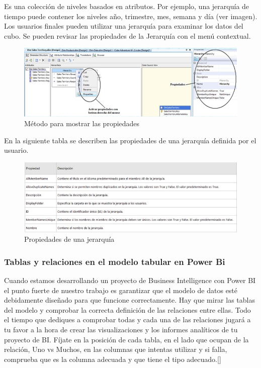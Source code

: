 \documentclass[11pt,a4paper]{article}
\begin{document}
			Es una colección de niveles basados en atributos. Por ejemplo, una jerarquía de tiempo puede contener los niveles año, trimestre, mes, semana y día (ver imagen). Los usuarios finales pueden utilizar una jerarquía para examinar los datos del cubo. Se pueden revisar las propiedades de la Jerarquía con el menú contextual.			
				\begin{figure}[H]
					\begin{center}
						\includegraphics[scale=0.75]{./Imagenes/img03}	
						\caption{Método para mostrar las propiedades}	
					\end{center}
				\end{figure}
			\newpage
			En la siguiente tabla se describen las propiedades de una jerarquía definida por el usuario.			
				\begin{figure}[H]
					\begin{center}
						\includegraphics[scale=0.75]{./Imagenes/img04}	
						\caption{Propiedades de una jerarquía }		
					\end{center}
				\end{figure}
			
			\subsubsection{Tablas y relaciones en el modelo tabular en Power Bi}
			
			Cuando estamos desarrollando un proyecto de Business Intelligence con Power BI el punto fuerte de nuestro trabajo es garantizar que el modelo de datos esté debidamente diseñado para que funcione correctamente. Hay que mirar las tablas del modelo y comprobar la correcta definición de las relaciones entre ellas.
			Todo el tiempo que dediques a comprobar todas y cada una de las relaciones jugará a tu favor a la hora de crear las visualizaciones y los informes analíticos de tu proyecto de BI. Fíjate en la posición de cada tabla, en el lado que ocupan de la relación, Uno vs Muchos, en las columnas que intentas utilizar y si falla, comprueba que es la columna adecuada y que tiene el tipo adecuado.[\cite{cuevas2016comparing}]
			
\end{document}
